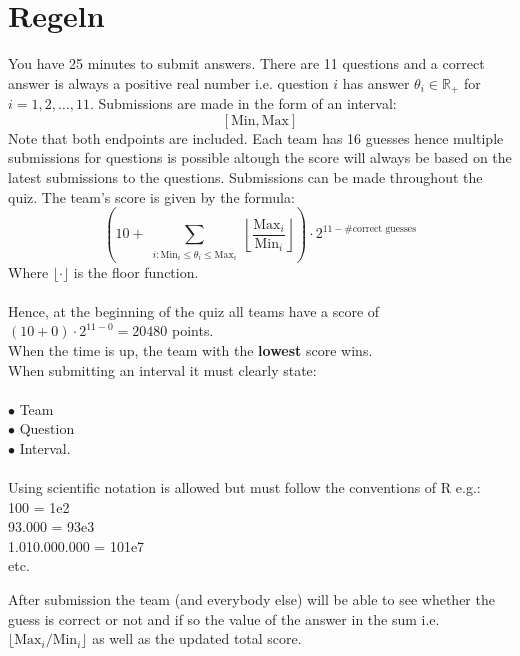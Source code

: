 \documentclass[10pt,a4paper]{article}
\begin{document}
 
\section*{Regeln}
You have 25 minutes to submit answers. There are 11 questions and a correct answer is always a positive real number i.e. question $i$ has answer $\theta_i \in \mathbb{R}_+$ for $i = 1,2,\ldots,11$. Submissions are made in the form of an interval:
$$
[\text{Min}, \text{Max}]
$$
Note that both endpoints are included. Each team has 16 guesses hence multiple submissions for questions is possible altough the score will always be based on the latest submissions to the questions.
Submissions can be made throughout the quiz. 
The team's score is given by the formula:
$$
\left( 10 + \sum_{\substack{i : \text{Min}_i \leq \theta_i \leq \text{Max}_i}} \left\lfloor \frac{\text{Max}_i}{\text{Min}_i} \right\rfloor \right) \cdot 2^{11 - \# \text{correct guesses} }
$$
Where $\lfloor \cdot \rfloor$ is the floor function.\\ \\
Hence, at the beginning of the quiz all teams have a score of
$(10 + 0)\cdot 2^{11-0} = 20480$ points. \\
When the time is up, the team with the \textbf{lowest} score wins.\\
When submitting an interval it must clearly state:\\ \\
$\bullet$ Team\\
$\bullet$ Question\\
$\bullet$ Interval. \\ \\
Using scientific notation is allowed but must follow the conventions of R e.g.:\\
100 = 1e2 \\
93.000 = 93e3 \\
1.010.000.000 = 101e7 \\
etc.

After submission the team (and everybody else) will be able to see whether the guess is correct or not and if so the value of the answer in the sum i.e. $\lfloor \text{Max}_i / \text{Min}_i \rfloor$ as well as the updated total score.

\newpage
\end{document}
